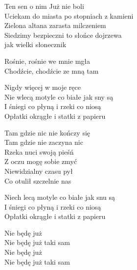 \begin{text}
    Ten sen o nim Już nie boli\\
    Uciekam do miasta po stopniach z kamieni\\
    Zielona altana zarasta milczeniem\\
    Siedzimy bezpieczni to słońce dojrzewa\\
    jak wielki słonecznik

    Rośnie, rośnie we mnie mgła\\
    Chodźcie, chodźcie ze mną tam

    Nigdy więcej w moje ręce\\
    Nie wlecą motyle co białe jak sny są\\
    I śniegi co płyną i rzeki co niosą\\
    Opłatki okrągłe i statki z papieru

    Tam gdzie nic nie kończy się\\
    Tam gdzie nie zaczyna nic\\
    Rzeka nuci swoją pieśń\\
    Z oczu mogę sobie zmyć\\
    Niewidzialny czasu pył\\
    Co otulił szczelnie nas

    Niech lecą motyle co białe jak snu są\\
    I śniegi co płyną i rzeki co niosą\\
    Opłatki okrągłe i statki z papieru

    Nie będę już\\
    Nie będę już taki sam\\
    Nie będę już\\
    Nie będę już taki sam
\end{text}
\begin{chord}

\end{chord}